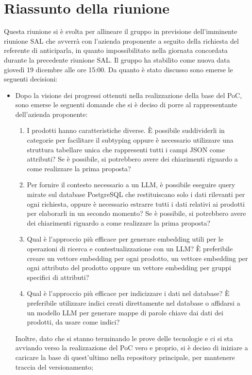 \section{Riassunto della riunione}
Questa riunione si è svolta per allineare il gruppo in previsione dell'imminente riunione SAL che avverrà con l’azienda proponente a seguito della richiesta del referente di anticiparla, in quanto impossibilitato nella giornata concordata durante la precedente riunione SAL. Il gruppo ha stabilito come nuova data giovedì 19 dicembre alle ore 15:00.
Da quanto è stato discusso sono emerse le seguenti decisioni:
\begin{itemize}
    \item Dopo la visione dei progressi ottenuti nella realizzazione della base del PoC, sono emerse le seguenti domande che si è deciso di porre al rappresentante dell'azienda proponente:
    \begin{enumerate}
        \item I prodotti hanno caratteristiche diverse. \`E possibile suddividerli in categorie per facilitare il subtyping oppure è necessario utilizzare una struttura tabellare unica che rappresenti tutti i campi JSON come attributi? Se è possibile, si potrebbero avere dei chiarimenti riguardo a come realizzare la prima proposta?
        \item Per fornire il contesto necessario a un LLM, è possibile eseguire query mirate sul database PostgreSQL che restituiscano solo i dati rilevanti per ogni richiesta, oppure è necessario estrarre tutti i dati relativi ai prodotti per elaborarli in un secondo momento? Se è possibile, si potrebbero avere dei chiarimenti riguardo a come realizzare la prima proposta?
        \item Qual è l'approccio più efficace per generare embedding utili per le operazioni di ricerca e contestualizzazione con un LLM? \`E preferibile creare un vettore embedding per ogni prodotto, un vettore embedding per ogni attributo del prodotto oppure un vettore embedding per gruppi specifici di attributi?
        \item Qual è l'approccio più efficace per indicizzare i dati nel database? \`E preferibile utilizzare indici creati direttamente nel database o affidarsi a un modello LLM per generare mappe di parole chiave dai dati dei prodotti, da usare come indici?
    \end{enumerate}
    Inoltre, dato che si stanno terminando le prove delle tecnologie e ci si sta avviando verso la realizzazione del PoC vero e proprio, si è deciso di iniziare a caricare la base di quest'ultimo nella repository principale, per mantenere traccia del versionamento;

\end{itemize}
